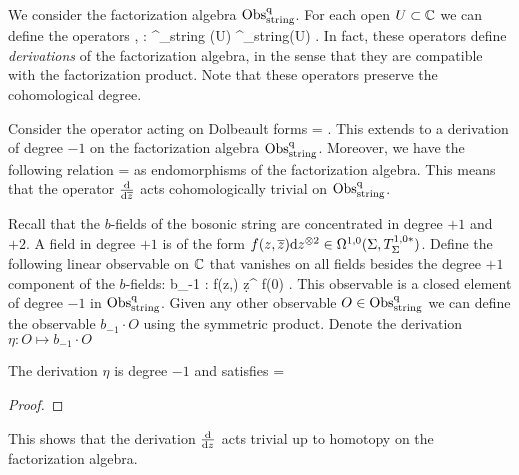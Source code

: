 
\subsubsection{}

We consider the factorization algebra ${\rm Obs}^{\rm q}_{\rm string}$. 
For each open $U \subset \mathbb C$ we can define the operators
\ben
{} , \frac{\d}{\d \zbar} : \Obs^\q_{\rm string} (U) \to \Obs^\q_{\rm string}(U) .
\een 
In fact, these operators define {\em derivations} of the factorization algebra, in the sense that they are compatible with the factorization product. 
Note that these operators preserve the cohomological degree. 

Consider the operator acting on Dolbeault forms
\ben
\Bar{\eta} = \frac{\partial}{\partial (\d \zbar)} .
\een 
This extends to a derivation of degree $-1$ on the factorization algebra ${\rm Obs}^{\rm q}_{\rm string}$. 
Moreover, we have the following relation
 =  \frac{\d}{\d \zbar}
\een 
as endomorphisms of the factorization algebra. 
This means that the operator $\frac{{\rm d}}{{\rm d} \overline{z}}$ acts cohomologically trivial on ${\rm Obs}^{\rm q}_{\rm string}$. 

Recall that the $b$-fields of the bosonic string are concentrated in degree $+1$ and $+2$. 
A field in degree $+1$ is of the form $f(z,\overline{z}) {\rm d} z^{\otimes 2} \in \Omega^{1,0}(\Sigma, T_\Sigma^{1,0*})$. 
Define the following linear observable on $\mathbb C$ that vanishes on all fields besides the degree $+1$ component of the $b$-fields:
\ben
b_{-1} : f(z,\zbar) \d z^{} \mapsto f(0) . 
\een 
This observable is a closed element of degree $-1$ in ${\rm Obs}^{\rm q}_{\rm string}$. 
Given any other observable $O \in {\rm Obs}^{{\rm q}}_{\rm string}$ we can define the observable $b_{-1} \cdot O$ using the symmetric product.
Denote the derivation $\eta : O \mapsto b_{-1} \cdot O$

\begin{lem} The derivation $\eta$ is degree $-1$ and satisfies 
 = 
\een
\end{lem}
\begin{proof} 
\end{proof}
This shows that the derivation $\frac{{\rm d}}{{\rm d} z}$ acts trivial up to homotopy on the factorization algebra. 
